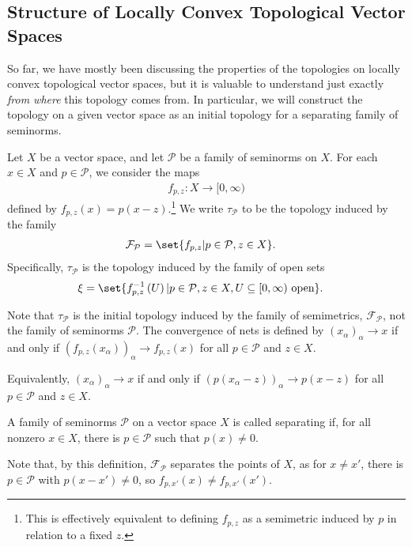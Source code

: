 \documentclass[10pt]{mypackage}
\begin{document}
\subsection{Structure of Locally Convex Topological Vector Spaces}%
So far, we have mostly been discussing the properties of the topologies on locally convex topological vector spaces, but it is valuable to understand just exactly \textit{from where} this topology comes from. In particular, we will construct the topology on a given vector space as an initial topology for a separating family of seminorms.
\begin{definition}
  Let $X$ be a vector space, and let $\mathcal{P}$ be a family of seminorms on $X$. For each $x\in X$  and $p\in \mathcal{P}$, we consider the maps
  \begin{align*}
    f_{p,z}:X\rightarrow [0,\infty)
  \end{align*}
  defined by $f_{p,z}(x) = p\left(x-z\right)$.\footnote{This is effectively equivalent to defining $f_{p,z}$ as a semimetric induced by $p$ in relation to a fixed $z$.} We write $\tau_{\mathcal{P}}$ to be the topology induced by the family
  \begin{align*}
    \mathcal{F}_{\mathcal{P}} &= \set{f_{p,z}| p\in \mathcal{P},z\in X}.
  \end{align*}
  Specifically, $\tau_{\mathcal{P}}$ is the topology induced by the family of open sets
  \begin{align*}
    \xi &= \set{f_{p,z}^{-1}\left(U\right)| p\in \mathcal{P},z\in X,U\subseteq [0,\infty)\text{ open}}.
  \end{align*}
\end{definition}
\begin{remark}
  Note that $\tau_{\mathcal{P}}$ is the initial topology induced by the family of semimetrics, $\mathcal{F}_{\mathcal{P}}$, not the family of seminorms $\mathcal{P}$. The convergence of nets is defined by $\left(x_{\alpha}\right)_{\alpha}\rightarrow x$ if and only if $\left(f_{p,z}\left(x_{\alpha}\right)\right)_{\alpha}\rightarrow f_{p,z}\left(x\right)$ for all $p\in \mathcal{P}$ and $z\in X$.\newline

  Equivalently, $\left(x_{\alpha}\right)_{\alpha}\rightarrow x$ if and only if $\left(p\left(x_{\alpha}-z\right)\right)_{\alpha}\rightarrow p\left(x-z\right)$ for all $p\in \mathcal{P}$ and $z\in X$.
\end{remark}
\begin{definition}
A family of seminorms $\mathcal{P}$ on a vector space $X$ is called separating if, for all nonzero $x\in X$, there is $p\in \mathcal{P}$ such that $p(x)\neq 0$.
\end{definition}
Note that, by this definition, $\mathcal{F}_{\mathcal{P}}$ separates the points of $X$, as for $x\neq x'$, there is $p\in \mathcal{P}$ with $p\left(x-x'\right)\neq 0$, so $f_{p,x'}\left(x\right)\neq f_{p,x'}\left(x'\right)$.\newline
\end{document}
